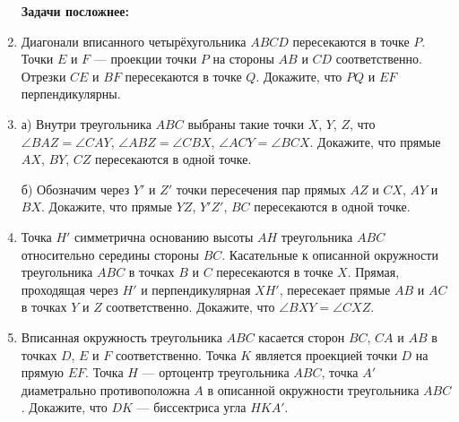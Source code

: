 \documentclass{article}
\begin{document}
\begin{enumerate}[label*=\protect\fbox{\arabic{enumi}}]
\textbf{Задачи посложнее:}

\item Диагонали вписанного четырёхугольника \(ABCD\) пересекаются в точке \(P\). Точки \(E\) и \(F\) — проекции точки \(P\) на стороны \(AB\) и \(CD\) соответственно. Отрезки \(CE\) и \(BF\) пересекаются в точке \(Q\). Докажите, что \(PQ\) и \(EF\) перпендикулярны.

\item а) Внутри треугольника \(ABC\) выбраны такие точки \(X\), \(Y\), \(Z\), что
\(\angle BAZ = \angle CAY\), \(\angle ABZ = \angle CBX\), \(\angle ACY = \angle BCX\).
Докажите, что прямые \(AX\), \(BY\), \(CZ\) пересекаются в одной точке.

б) Обозначим через \(Y'\) и \(Z'\) точки пересечения пар прямых \(AZ\) и \(CX\), \(AY\) и \(BX\). Докажите, что прямые \(YZ\), \(Y'Z'\), \(BC\) пересекаются в одной точке.

\item Точка \(H'\) симметрична основанию высоты \(AH\) треугольника \(ABC\) относительно середины стороны \(BC\). Касательные к описанной окружности треугольника \(ABC\) в точках \(B\) и \(C\) пересекаются в точке \(X\). Прямая, проходящая через \(H'\) и перпендикулярная \(XH'\), пересекает прямые \(AB\) и \(AC\) в точках \(Y\) и \(Z\) соответственно. Докажите, что \(\angle BXY = \angle CXZ\).

\item Вписанная окружность треугольника \(ABC\) касается сторон \(BC\), \(CA\) и \(AB\) в точках \(D\), \(E\) и \(F\) соответственно. Точка \(K\) является проекцией точки \(D\) на прямую \(EF\). Точка \(H\) — ортоцентр треугольника \(ABC\), точка \(A'\) диаметрально противоположна \(A\) в описанной окружности треугольника \(ABC\). Докажите, что \(DK\) — биссектриса угла \(HKA'\).

\end{enumerate}
\end{document}
